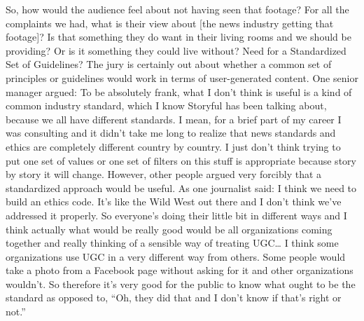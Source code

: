 \begin{enumerate}
So, how would the audience feel about not having seen that footage?
For all the complaints we had, what is their view about [the news
industry getting that footage]? Is that something they do want in
their living rooms and we should be providing? Or is it something
they could live without?
Need for a Standardized Set of Guidelines?
The jury is certainly out about whether a common set of principles or
guidelines would work in terms of user-generated content. One senior
manager argued:
To be absolutely frank, what I don't think is useful is a kind of common
industry standard, which I know Storyful has been talking
about, because we all have different standards. I mean, for a brief part
of my career I was consulting and it didn't take me long to realize that
news standards and ethics are completely different country by country.
I just don't think trying to put one set of values or one set of filters
on this stuff is appropriate because story by story it will change.
However, other people argued very forcibly that a standardized approach
would be useful. As one journalist said:
I think we need to build an ethics code. It's like the Wild West out
there and I don't think we've addressed it properly. So everyone's
doing their little bit in different ways and I think actually what would
be really good would be all organizations coming together and really
thinking of a sensible way of treating UGC… I think some organizations
use UGC in a very different way from others. Some people
would take a photo from a Facebook page without asking for it and
other organizations wouldn't. So therefore it's very good for the public
to know what ought to be the standard as opposed to, ``Oh, they
did that and I don't know if that's right or not.''


\end{enumerate}
